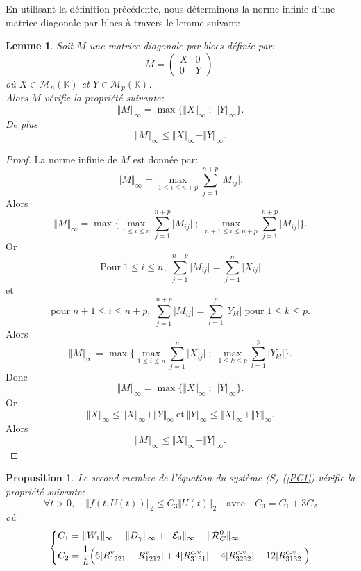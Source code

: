 \documentclass[12pt,a4paper,openany,oneside]{book}
\newtheorem{lemma}{Lemme}[chapter]
\newtheorem{proposition}{Proposition}[chapter]
\begin{document}
{{{{{{En utilisant la définition précédente, nous déterminons la norme infinie d'une matrice diagonale par blocs à travers le lemme suivant: 

\begin{lemma}\label{lemme pour la matrice diagonale par bloc}
Soit $ M $ une matrice diagonale par blocs définie par:
$$ M = \begin{pmatrix}
X & 0\\
0 & Y
\end{pmatrix} .$$ 
où $ X\in \mathcal{M}_{n}(\mathbb{K}) $ et $ Y \in \mathcal{M}_{p}(\mathbb{K})$.\\
 Alors $ M $ vérifie la propriété suivante:
$$ \Vert M \Vert_{\infty}=\max\{\Vert X \Vert_{\infty} \; ; \; \Vert Y \Vert_{\infty}\} .$$
De plus $$ \Vert M \Vert_{\infty}\leq \Vert X \Vert_{\infty}+\Vert Y \Vert_{\infty} .$$
\end{lemma}
\begin{proof}
La norme infinie de $ M $ est donnée par:
$$ \Vert M \Vert_{\infty} = \max_{1\leq i \leq n+p}\sum_{j=1}^{n+p}\vert M_{ij}\vert.$$
Alors $$ \Vert M \Vert_{\infty}= \max\Big\{\max_{1\leq i \leq n}\sum_{j=1}^{n+p}\vert M_{ij}\vert \; ; \; \max_{n+1\leq i \leq n+p}\sum_{j=1}^{n+p}\vert M_{ij}\vert \Big\} .$$
Or 
$$ \textrm{Pour} \;1\leq i \leq n,\; \sum_{j=1}^{n+p}\vert M_{ij}\vert = \sum_{j=1}^{n}\vert X_{ij}\vert $$ et
$$\textrm{pour} \;n+1\leq i \leq n+p,\;\sum_{j=1}^{n+p}\vert M_{ij}\vert =\sum_{l=1}^{p}\vert Y_{kl}\vert \; \textrm{pour} \;1\leq k \leq p. $$
Alors 
$$ \Vert M \Vert_{\infty}= \max\Big\{\max_{1\leq i \leq n}\sum_{j=1}^{n}\vert X_{ij}\vert \; ; \; \max_{1\leq k \leq p}\sum_{l=1}^{p}\vert Y_{kl}\vert \Big\} .$$
Donc $$ \Vert M \Vert_{\infty}=\max\{\Vert X \Vert_{\infty} \; ; \; \Vert Y \Vert_{\infty}\} .$$
Or $$ \Vert X \Vert_{\infty}\leq \Vert X \Vert_{\infty}+\Vert Y \Vert_{\infty}\: \textrm {et}\: \Vert Y \Vert_{\infty}\leq \Vert X \Vert_{\infty}+\Vert Y \Vert_{\infty} .$$
Alors $$ \Vert M \Vert_{\infty}\leq \Vert X \Vert_{\infty}+\Vert Y \Vert_{\infty} .$$
\end{proof}

\begin{proposition}\label{f bornee}
Le second membre de l'équation du système (S) (\ref{PC1}) vérifie la propriété suivante:
$$\forall t>0,\quad \Vert f(t,U(t))\Vert_{2}\leq C_{3}\Vert U(t)\Vert_{2} \quad \textrm{avec}\quad C_{3}=C_{1}+3C_{2} $$
où 
\begin{eqnarray*}
  \left\{
\begin{split}
C_{1}&=\Vert W_{1} \Vert_{\infty}+\Vert D_{\gamma} \Vert_{\infty}+\Vert \mathcal{E}_{0}\Vert_{\infty}+ \Vert \mathcal{R}^{0}_{C} \Vert_{\infty}\\
C_{2}&=\dfrac{1}{\hbar}\Big(6\vert R^{\textsc{v}}_{1221}-R^{\textsc{v}}_{1212}\vert + 4\vert R^{\textsc{c-v}}_{3131}\vert + 4\vert R^{\textsc{c-v}}_{3232}\vert + 12\vert R^{\textsc{c-v}}_{3132} \vert\Big )
\end{split}
\right.
 \end{eqnarray*}
\end{proposition}

}}}}}}
\end{document}
